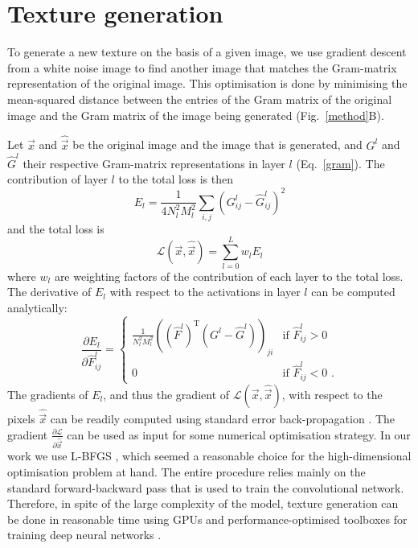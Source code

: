 \documentclass{article} %
\begin{document}
\section{Texture generation}
To generate a new texture on the basis of a given image, we use gradient descent from a white noise image to find another image that matches the Gram-matrix representation of the original image. This optimisation is done by minimising the mean-squared distance between the entries of the Gram matrix of the original image and the Gram matrix of the image being generated (Fig.~\ref{method}B). 

Let $\vec{x}$ and $\hat{\vec{x}}$ be the original image and the image that is generated, and $G^l$ and $\hat{G}^l$ their respective Gram-matrix representations in layer $l$ (Eq.~\ref{gram}). The contribution of layer $l$ to the total loss is then
\begin{equation}
E_l = \frac{1}{4 N_l^2 M_l^2}\sum_{i,j}\left(G^l_{ij}-\hat{G}^l_{ij}\right)^2
\end{equation}
and the total loss is 
\begin{equation}
\mathcal{L}(\vec{x},\hat{\vec{x}}) = \sum_{l=0}^{L}w_{l}E_l
\end{equation}
where $w_l$ are weighting factors of the contribution of each layer to the total loss.
The derivative of $E_l$ with respect to the activations in layer $l$ can be computed analytically:
\begin{equation}
\frac{\partial E_l}{\partial \hat{F}_{ij}^l} =
  \begin{cases}
   \frac{1}{N_l^2 M_l^2}\left((\hat{F}^l)^{\mathrm T}\left(G^l-\hat{G}^l\right)\right)_{ji} & \text{if } \hat{F}_{ij}^l > 0 \\
   0       & \text{if } \hat{F}_{ij}^l < 0 \text{ .}
  \end{cases}
\end{equation}
The gradients of $E_l$, and thus the gradient of $\mathcal{L}(\vec{x},\hat{\vec{x}})$, with respect to the pixels $\hat{\vec{x}}$ can be readily computed using standard error back-propagation \cite{lecun_efficient_2012}. 
The gradient $\frac{\partial\mathcal{L}}{\partial\hat{\vec{x}}}$ can be used as input for some numerical optimisation strategy. In our work we use L-BFGS \cite{zhu_algorithm_1997}, which seemed a reasonable choice for the high-dimensional optimisation problem at hand. 
The entire procedure relies mainly on the standard forward-backward pass that is used to train the convolutional network. Therefore, in spite of the large complexity of the model, texture generation can be done in reasonable time using GPUs and performance-optimised toolboxes for training deep neural networks \cite{jia_caffe:_2014}.
\end{document}
